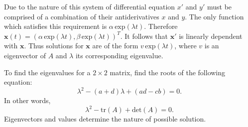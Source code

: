 \documentclass[nobib,notoc]{tufte-handout}
\begin{document}
Due to the nature of this system of differential equation \(x'\) and \(y'\) must be comprised of a combination of their antiderivatives \(x\) and \(y\). The only function which satisfies this requirement is \(\alpha\,\text{exp}(\lambda t)\). Therefore \(\mathbf{x}(t)=(\alpha\,\text{exp}(\lambda t),\beta\,\text{exp}(\lambda t))^{T}\). It follows that \(\mathbf{x}'\) is linearly dependent with \(\mathbf{x}\). Thus solutions for \(\textbf{x}\) are of the form \(v\,\text{exp}(\lambda t)\), where \(v\) is an eigenvector of \(A\) and \(\lambda\) its corresponding eigenvalue.
\begin{rema}
	To find the eigenvalues for a \(2\times 2\) matrix, find the roots of the following equation:
	\begin{equation*}
		\lambda^2-(a+d)\lambda+(ad-cb)=0.
	\end{equation*}
	In other words,
	\begin{equation*}
		\lambda^2-\text{tr}(A)+\text{det}(A)=0.
	\end{equation*}
	Eigenvectors and values determine the nature of possible solution.
\end{rema}
\end{document}
